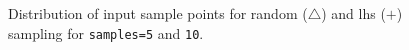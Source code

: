 \begin{figure}
  \centering
  \caption{Distribution of input sample points for random ($\triangle$)
    and lhs ($+$) sampling for \texttt{samples=5} and \texttt{10}.}
  \label{uq:figure02}
\end{figure}

